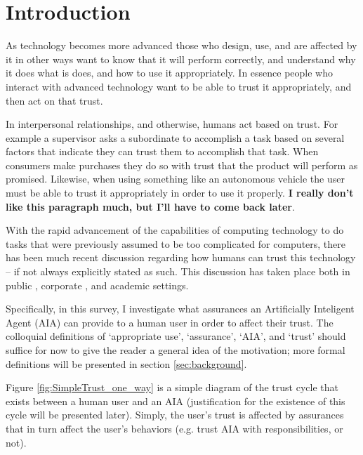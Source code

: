 \section{Introduction}
    As technology becomes more advanced those who design, use, and are affected by it in other ways want to know that it will perform correctly, and understand why it does what is does, and how to use it appropriately. In essence people who interact with advanced technology want to be able to trust it appropriately, and then act on that trust.

    In interpersonal relationships, and otherwise, humans act based on trust. For example a supervisor asks a subordinate to accomplish a task based on several factors that indicate they can trust them to accomplish that task. When consumers make purchases they do so with trust that the product will perform as promised. Likewise, when using something like an autonomous vehicle the user must be able to trust it appropriately in order to use it properly. \textbf{I really don't like this paragraph much, but I'll have to come back later}.

    With the rapid advancement of the capabilities of computing technology to do tasks that were previously assumed to be too complicated for computers, there has been much recent discussion regarding how humans can trust this technology -- if not always explicitly stated as such. This discussion has taken place both in public \cite{Spectrum2016-jv,DeSteno2014-cq,Cranz2017-yh,Cassel2017-tn,Danks_undated-sb}, corporate \cite{Banavar2016-nm, Khosravi2016-ke,Moody2017-vd,Rudnitsky2017-in,Benioff2016-tc}, and academic \cite{Groom2007-bz,Lloyd_undated-bb,Goodrum_2016-fm,Foley2017-qj,Ghahramani2015-yq,Castelvecchi2016-mr} settings.

    Specifically, in this survey, I investigate what assurances an Artificially Inteligent Agent (AIA) can provide to a human user in order to affect their trust. The colloquial definitions of `appropriate use', `assurance', `AIA', and `trust' should suffice for now to give the reader a general idea of the motivation; more formal definitions will be presented in section \ref{sec:background}.

    Figure \ref{fig:SimpleTrust_one_way} is a simple diagram of the trust cycle that exists between a human user and an AIA (justification for the existence of this cycle will be presented later). Simply, the user's trust is affected by assurances that in turn affect the user's behaviors (e.g. trust AIA with responsibilities, or not).

